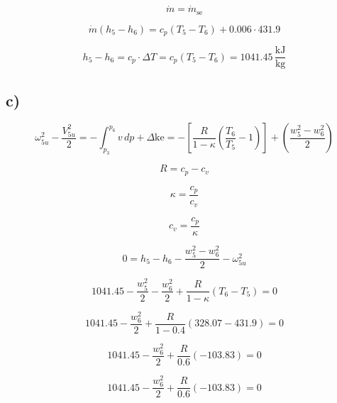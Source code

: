 \[
\dot{m} = \dot{m}_{\text{se}}
\]

\[
\dot{m} (h_5 - h_6) = c_p (T_5 - T_6) + 0.006 \cdot 431.9
\]

\[
h_5 - h_6 = c_p \cdot \Delta T = c_p (T_5 - T_6) = 1041.45 \, \frac{\text{kJ}}{\text{kg}}
\]

\subsection*{c)}

\[
\omega_{5u}^2 - \frac{V_{5u}^2}{2} = - \int_{p_3}^{p_6} v \, dp + \Delta \text{ke} = - \left[ \frac{R}{1 - \kappa} \left( \frac{T_6}{T_5} - 1 \right) \right] + \left( \frac{w_5^2 - w_6^2}{2} \right)
\]

\[
R = c_p - c_v
\]

\[
\kappa = \frac{c_p}{c_v}
\]

\[
c_v = \frac{c_p}{\kappa}
\]

\[
0 = h_5 - h_6 - \frac{w_5^2 - w_6^2}{2} - \omega_{5u}^2
\]

\[
1041.45 - \frac{w_5^2}{2} - \frac{w_6^2}{2} + \frac{R}{1 - \kappa} (T_6 - T_5) = 0
\]

\[
1041.45 - \frac{w_6^2}{2} + \frac{R}{1 - 0.4} (328.07 - 431.9) = 0
\]

\[
1041.45 - \frac{w_6^2}{2} + \frac{R}{0.6} (-103.83) = 0
\]

\[
1041.45 - \frac{w_6^2}{2} + \frac{R}{0.6} (-103.83) = 0
\]

